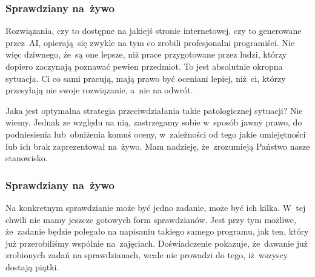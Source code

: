 \documentclass[10pt,t]{beamer}
\begin{document}
\begin{frame}
  \frametitle{Sprawdziany na~żywo}


  Rozwiązania, czy to dostępne na jakiejś stronie internetowej, czy to
  generowane przez~AI, opierają~się zwykle na tym co zrobili profesjonalni
  programiści. Nic więc dziwnego, że~są one lepsze, niż prace przygotowane
  przez ludzi, którzy dopiero zaczynają poznawać pewien przedmiot. To jest
  absolutnie okropna sytuacja. Ci co sami pracują, mają prawo być oceniani
  lepiej, niż~ci, którzy przesyłają nie swoje rozwiązanie, a~nie na odwrót.

  Jaka jest optymalna strategia przeciwdziałania takie patologicznej
  sytuacji? Nie wiemy. Jednak ze względu na nią, zastrzegamy sobie
  w~sposób jawny prawo, do \alert{podniesienia} lub~\alert{obniżenia} komuś
  oceny, w~zależności od tego jakie umiejętności lub ich brak zaprezentował
  na~żywo. Mam nadzieję, że~zrozumieją Państwo nasze stanowisko.

\end{frame}





\begin{frame}
  \frametitle{Sprawdziany na~żywo}




  Na konkretnym sprawdzianie może być jedno zadanie, może być ich kilka.
  W~tej chwili nie mamy jeszcze gotowych form sprawdzianów. Jest przy tym
  możliwe, że~zadanie będzie polegało na napisaniu takiego samego
  programu, jak ten, który już przerobiliśmy wspólnie na~zajęciach.
  Doświadczenie pokazuje, że~dawanie już zrobionych zadań na
  sprawdzianach, wcale nie prowadzi do tego, iż~wszyscy dostają piątki.

\end{frame}
\end{document}
